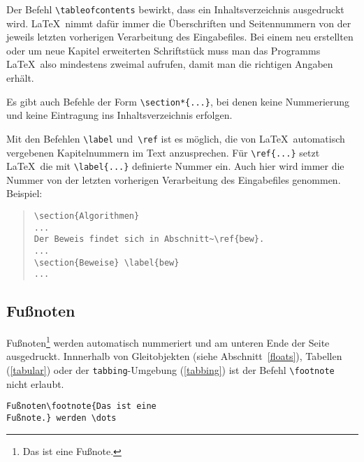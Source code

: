  
Der Befehl \verb|\tableofcontents| bewirkt, dass ein
Inhaltsverzeichnis ausgedruckt wird.
\LaTeX\ nimmt dafür immer die Überschriften und Seitennummern
von der jeweils letzten vorherigen Verarbeitung des Eingabefiles.
Bei einem neu erstellten oder um neue Kapitel erweiterten
Schriftstück muss man das Programms \LaTeX\ also mindestens
zweimal aufrufen, damit man die richtigen Angaben erhält.
 
Es gibt auch Befehle der Form \verb|\section*{...}|, bei denen
keine Nummerierung und keine Eintragung ins Inhaltsverzeichnis
erfolgen.

Mit den Befehlen \verb|\label| und~\verb|\ref| ist es möglich,
die von \LaTeX\ automatisch vergebenen Kapitelnummern im Text
anzusprechen.
Für \verb|\ref{...}| setzt \LaTeX\ die
mit \verb|\label{...}| definierte Nummer ein.
Auch hier wird immer die Nummer von der letzten vorherigen
Verarbeitung des Eingabefiles genommen.
Beispiel:
\begin{quote}
\begin{verbatim}
\section{Algorithmen}
...
Der Beweis findet sich in Abschnitt~\ref{bew}.
...
\section{Beweise} \label{bew}
...
\end{verbatim}
\end{quote}
 
 
\subsection{Fußnoten}
 
Fußnoten\footnote{Das 
ist eine Fußnote.} werden automatisch nummeriert
und am unteren Ende der Seite ausgedruckt.  
Innnerhalb von Gleitobjekten (siehe Abschnitt~\ref{floats}), 
Tabellen (\ref{tabular}) oder der \texttt{tabbing}-Umgebung (\ref{tabbing})
ist der Befehl \verb|\footnote| nicht erlaubt.
\exa
~
\exb
\begin{verbatim}
Fußnoten\footnote{Das ist eine
Fußnote.} werden \dots
\end{verbatim}
\exc
 
